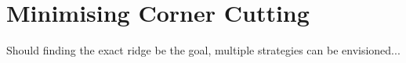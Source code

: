 \section{Minimising Corner Cutting}
\label{sec:erm-corner-cutting}

Should finding the exact ridge be the goal, multiple strategies can be envisioned...

\placeholder
